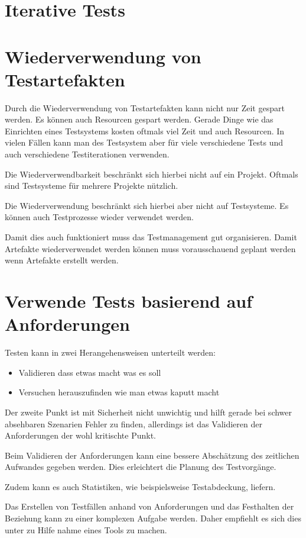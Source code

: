 \section{Iterative Tests}

\section{Wiederverwendung von Testartefakten}
Durch die Wiederverwendung von Testartefakten kann nicht nur Zeit gespart werden. Es k\"onnen auch Resourcen gespart werden. Gerade Dinge wie das Einrichten eines Testsystems kosten oftmals viel Zeit und auch Resourcen. In vielen F\"allen kann man des Testsystem aber f\"ur viele verschiedene Tests und auch verschiedene Testiterationen verwenden.

Die Wiederverwendbarkeit beschr\"ankt sich hierbei nicht auf ein Projekt. Oftmals sind Testsysteme f\"ur mehrere Projekte n\"utzlich. 

Die Wiederverwendung beschr\"ankt sich hierbei aber nicht auf Testsysteme. Es k\"onnen auch Testprozesse wieder verwendet werden.

Damit dies auch funktioniert muss das Testmanagement gut organisieren. Damit Artefakte wiederverwendet werden k\"onnen muss vorausschauend geplant werden wenn Artefakte erstellt werden.

\section{Verwende Tests basierend auf Anforderungen}
Testen kann in zwei Herangehensweisen unterteilt werden:
\begin{itemize}
	\item Validieren dass etwas macht was es soll
	\item Versuchen herauszufinden wie man etwas kaputt macht
\end{itemize}

Der zweite Punkt ist mit Sicherheit nicht unwichtig und hilft gerade bei schwer absehbaren Szenarien Fehler zu finden, allerdings ist das Validieren der Anforderungen der wohl kritischte Punkt.

Beim Validieren der Anforderungen kann eine bessere Absch\"atzung des zeitlichen Aufwandes gegeben werden. Dies erleichtert die Planung des Testvorg\"ange.

Zudem kann es auch Statistiken, wie beispielsweise Testabdeckung, liefern.

Das Erstellen von Testf\"allen anhand von Anforderungen und das Festhalten der Beziehung kann zu einer komplexen Aufgabe werden. Daher empfiehlt es sich dies unter zu Hilfe nahme eines Tools zu machen.

